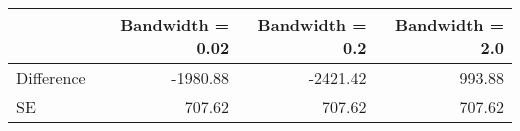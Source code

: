 \begin{table}[h!]
\begin{center}
\begin{tabular}{lrrr}
\toprule
 & Bandwidth = 0.02 & Bandwidth = 0.2 & Bandwidth = 2.0  \\
\hline
Difference & -1980.88 & -2421.42 & 993.88 \\
SE & 707.62 & 707.62 & 707.62 \\
\bottomrule
\end{tabular}
\end{center}
\end{table}
